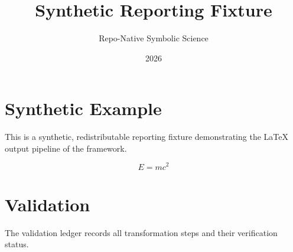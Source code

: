 \documentclass{article}
\begin{document}
\title{Synthetic Reporting Fixture}
\author{Repo-Native Symbolic Science}
\date{2026}
\maketitle

\section{Synthetic Example}

This is a synthetic, redistributable reporting fixture demonstrating
the LaTeX output pipeline of the framework.

\begin{equation}
    E = mc^2
\end{equation}

\section{Validation}

The validation ledger records all transformation steps and their
verification status.
\end{document}
